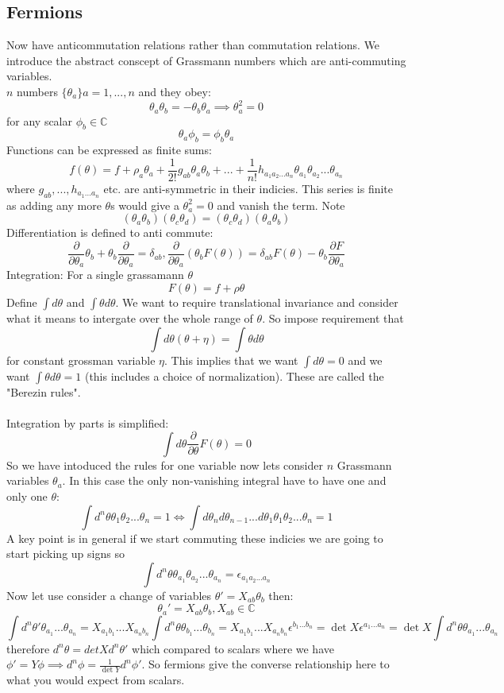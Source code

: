 \documentclass{article}
\begin{document}
\subsection{Fermions}
Now have anticommutation relations rather than commutation relations. We introduce the abstract conscept of Grassmann numbers which are anti-commuting variables.\\
$n$ numbers $\{ \theta_a \} a = 1,..., n$ and they obey:
$$
\theta_a \theta_b = - \theta_b \theta_a \implies \theta_a^2 = 0
$$
for any scalar $\phi_b \in \mathbb{C}$
$$
\theta_a \phi_b = \phi_b \theta_a
$$
Functions can be expressed as finite sums:
$$
f(\theta) = f + \rho_a \theta_a + \frac{1}{2!} g_{ab} \theta_a \theta_b + ... + \frac{1}{n!}h_{a_1a_2...a_n} \theta_{a_1} \theta_{a_2} ... \theta_{a_n}
$$
where $g_{ab},..., h_{a_1...a_n}$ etc. are anti-symmetric in their indicies. This series is finite as adding any more $\theta$s would give a $\theta_a^2=0$ and vanish the term. Note
$$
(\theta_a \theta_b) (\theta_c \theta_d) = (\theta_c \theta_d) (\theta_a \theta_b)
$$
Differentiation is defined to anti commute:
$$
\frac{\partial}{\partial \theta_a} \theta_b + \theta_b \frac{\partial}{\partial \theta_a} = \delta_{ab}, \frac{\partial}{\partial \theta_a}( \theta_b F(\theta)) = \delta_{ab} F(\theta) - \theta_b \frac{\partial F}{\partial \theta_a}
$$
Integration: For a single grassamann $\theta$
$$
F(\theta) = f+ \rho \theta
$$
Define $\int d\theta$ and $\int \theta d\theta$. We want to require translational invariance and consider what it means to intergate over the whole range of $\theta$. So impose requirement that
$$
\int d \theta( \theta + \eta) = \int \theta d\theta 
$$
for constant grossman variable $\eta$. This implies that we want $\int d\theta = 0$ and we want $\int \theta d\theta = 1$ (this includes a choice of normalization). These are called the "Berezin rules". \\\\
Integration by parts is simplified:
$$
\int d\theta \frac{\partial}{\partial \theta} F(\theta) = 0
$$
So we have intoduced the rules for one variable now lets consider $n$ Grassmann variables $\theta_a$. In this case the only non-vanishing integral have to have one and only one $\theta$:
$$
\int d^n \theta \theta_1 \theta_2... \theta_n = 1 \iff \int d \theta_n d\theta_{n-1} ... d\theta_1 \theta_1 \theta_2... \theta_n = 1
$$
A key point is in general if we start commuting these indicies we are going to start picking up signs so
$$
\int d^n \theta \theta_{a_1} \theta_{a_2} ... \theta_{a_n} = \epsilon_{a_1 a_2... a_n}
$$
Now let use consider a change of variables $\theta' = X_{ab} \theta_b$ then:
$$
\theta_a' = X_{ab} \theta_b, X_{ab} \in \mathbb{C}
$$
$$
\int d^n \theta' \theta_{a_1} ... \theta_{a_n} = X_{a_1 b_1} ... X_{a_n b_n}  \int d^n \theta \theta_{b_1}... \theta_{b_n} = X_{a_1 b_1} ... X_{a_n b_n}   \epsilon^{b_1... b_n} = \det X \epsilon^{a_1...a_n} = \det X \int d^n \theta \theta_{a_1}... \theta_{a_n}
$$
therefore $d^n \theta = det X d^n \theta'$ which compared to scalars where we have $\phi' = Y \phi \implies d^n \phi = \frac{1}{\det Y} d^n \phi'$. So fermions give the converse relationship here to what you would expect from scalars.
\end{document}

